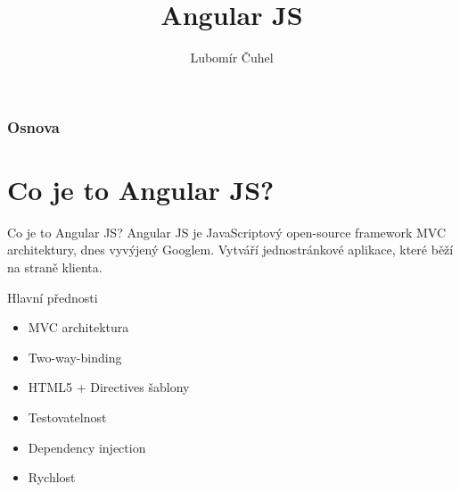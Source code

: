 \documentclass[czech]{beamer}
\title{Angular JS}
\institute[CVUT FIT]{Fakulta informacních technologí}
\author{Lubomír Čuhel}
\institute[FIT]
\begin{document}
    \begin{frame}
        \titlepage
    \end{frame}

    \begin{frame}
        \frametitle{Osnova}
        \tableofcontents
    \end{frame}

    \section{Co je to Angular JS?}
    \begin{frame}
        \begin{block}{Co je to Angular JS?}
	        Angular JS je JavaScriptový open-source framework MVC architektury, dnes vyvýjený Googlem. Vytváří jednostránkové aplikace, které běží na straně klienta.
        \end{block}
        \begin{block}{Hlavní přednosti}
            \begin{itemize}
                \item MVC architektura
                \item Two-way-binding
                \item HTML5 + Directives šablony
                \item Testovatelnost
                \item Dependency injection
                \item Rychlost
            \end{itemize}        
        \end{block}
    \end{frame}
\end{document}
